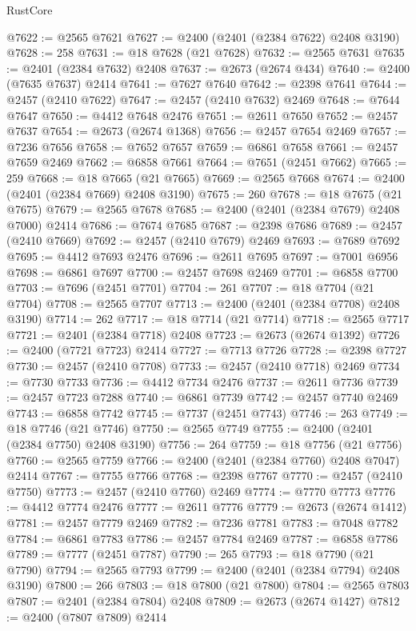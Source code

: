\begin{lexlean}{RustCore}
\begin{coremodule}
@7622 := @2565 @7621
@7627 := @2400 (@2401 (@2384 @7622) @2408 @3190)
@7628 := 258
@7631 := @18 @7628 (@21 @7628)
@7632 := @2565 @7631
@7635 := @2401 (@2384 @7632) @2408
@7637 := @2673 (@2674 @434)
@7640 := @2400 (@7635 @7637) @2414
@7641 := @7627 @7640
@7642 := @2398 @7641
@7644 := @2457 (@2410 @7622)
@7647 := @2457 (@2410 @7632) @2469
@7648 := @7644 @7647
@7650 := @4412 @7648 @2476
@7651 := @2611 @7650
@7652 := @2457 @7637
@7654 := @2673 (@2674 @1368)
@7656 := @2457 @7654 @2469
@7657 := @7236 @7656
@7658 := @7652 @7657
@7659 := @6861 @7658
@7661 := @2457 @7659 @2469
@7662 := @6858 @7661
@7664 := @7651 (@2451 @7662)
@7665 := 259
@7668 := @18 @7665 (@21 @7665)
@7669 := @2565 @7668
@7674 := @2400 (@2401 (@2384 @7669) @2408 @3190)
@7675 := 260
@7678 := @18 @7675 (@21 @7675)
@7679 := @2565 @7678
@7685 := @2400 (@2401 (@2384 @7679) @2408 @7000) @2414
@7686 := @7674 @7685
@7687 := @2398 @7686
@7689 := @2457 (@2410 @7669)
@7692 := @2457 (@2410 @7679) @2469
@7693 := @7689 @7692
@7695 := @4412 @7693 @2476
@7696 := @2611 @7695
@7697 := @7001 @6956
@7698 := @6861 @7697
@7700 := @2457 @7698 @2469
@7701 := @6858 @7700
@7703 := @7696 (@2451 @7701)
@7704 := 261
@7707 := @18 @7704 (@21 @7704)
@7708 := @2565 @7707
@7713 := @2400 (@2401 (@2384 @7708) @2408 @3190)
@7714 := 262
@7717 := @18 @7714 (@21 @7714)
@7718 := @2565 @7717
@7721 := @2401 (@2384 @7718) @2408
@7723 := @2673 (@2674 @1392)
@7726 := @2400 (@7721 @7723) @2414
@7727 := @7713 @7726
@7728 := @2398 @7727
@7730 := @2457 (@2410 @7708)
@7733 := @2457 (@2410 @7718) @2469
@7734 := @7730 @7733
@7736 := @4412 @7734 @2476
@7737 := @2611 @7736
@7739 := @2457 @7723 @7288
@7740 := @6861 @7739
@7742 := @2457 @7740 @2469
@7743 := @6858 @7742
@7745 := @7737 (@2451 @7743)
@7746 := 263
@7749 := @18 @7746 (@21 @7746)
@7750 := @2565 @7749
@7755 := @2400 (@2401 (@2384 @7750) @2408 @3190)
@7756 := 264
@7759 := @18 @7756 (@21 @7756)
@7760 := @2565 @7759
@7766 := @2400 (@2401 (@2384 @7760) @2408 @7047) @2414
@7767 := @7755 @7766
@7768 := @2398 @7767
@7770 := @2457 (@2410 @7750)
@7773 := @2457 (@2410 @7760) @2469
@7774 := @7770 @7773
@7776 := @4412 @7774 @2476
@7777 := @2611 @7776
@7779 := @2673 (@2674 @1412)
@7781 := @2457 @7779 @2469
@7782 := @7236 @7781
@7783 := @7048 @7782
@7784 := @6861 @7783
@7786 := @2457 @7784 @2469
@7787 := @6858 @7786
@7789 := @7777 (@2451 @7787)
@7790 := 265
@7793 := @18 @7790 (@21 @7790)
@7794 := @2565 @7793
@7799 := @2400 (@2401 (@2384 @7794) @2408 @3190)
@7800 := 266
@7803 := @18 @7800 (@21 @7800)
@7804 := @2565 @7803
@7807 := @2401 (@2384 @7804) @2408
@7809 := @2673 (@2674 @1427)
@7812 := @2400 (@7807 @7809) @2414

\end{coremodule}
\end{lexlean}
